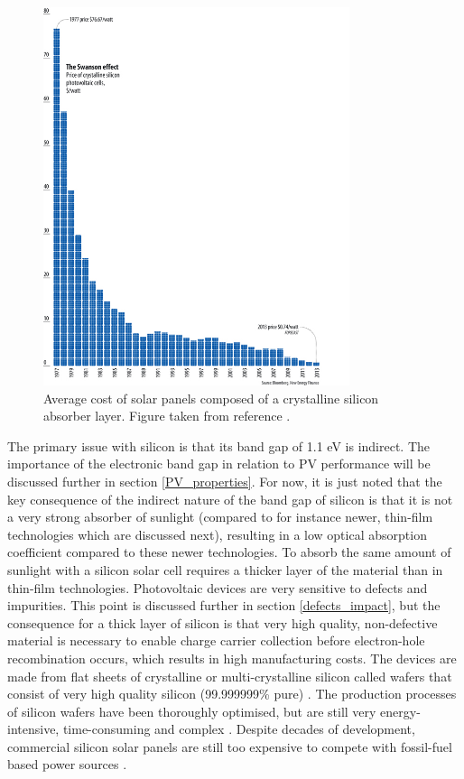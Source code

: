 \documentclass[11pt, twoside]{report}
\begin{document}
\begin{figure}[h!]
  \centering
    \includegraphics[width=0.8\textwidth]{figures/Si_cost.jpg}
    \caption{Average cost of solar panels composed of a crystalline silicon absorber layer. Figure taken from reference .}
  \label{Si_cost}
\end{figure}

The primary issue with silicon is that its band gap of 1.1 eV is indirect. The importance of the electronic band gap in relation to PV performance will be discussed further in section \ref{PV_properties}. For now, it is just noted that the key consequence of the indirect nature of the band gap of silicon is that it is not a very strong absorber of sunlight (compared to for instance newer, thin-film technologies which are discussed next), resulting in a low optical absorption coefficient  compared to these newer technologies. To absorb the same amount of sunlight with a silicon solar cell requires a thicker layer of the material than in thin-film technologies. Photovoltaic devices are very sensitive to defects and impurities. This point is discussed further in section \ref{defects_impact}, but the consequence for a thick layer of silicon is that very high quality, non-defective material is necessary to enable charge carrier collection before electron-hole recombination occurs, which results in high manufacturing costs. The devices are made from flat sheets of crystalline or multi-crystalline silicon called wafers that consist of very high quality silicon (99.999999\% pure) 
\cite{sus_book_5}.
The production processes of silicon wafers have been thoroughly optimised, but are still very energy-intensive, time-consuming and complex \cite{emerging_pv}.
Despite decades of development, commercial silicon solar panels are still too expensive to compete with fossil-fuel based power sources \cite{FE_PV_rev1_5}. 
\end{document}
